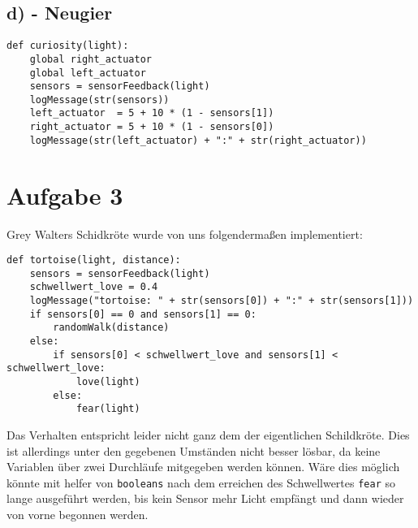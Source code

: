 \documentclass{./Vorlage/mat}
\begin{document}
\subsection*{d) - Neugier}
\begin{lstlisting}
def curiosity(light):
    global right_actuator
    global left_actuator
    sensors = sensorFeedback(light)
    logMessage(str(sensors))
    left_actuator  = 5 + 10 * (1 - sensors[1])
    right_actuator = 5 + 10 * (1 - sensors[0])
    logMessage(str(left_actuator) + ":" + str(right_actuator))
\end{lstlisting}

\section*{Aufgabe 3}

Grey Walters Schidkröte wurde von uns folgendermaßen implementiert:

\begin{lstlisting}
def tortoise(light, distance):
	sensors = sensorFeedback(light)
	schwellwert_love = 0.4
	logMessage("tortoise: " + str(sensors[0]) + ":" + str(sensors[1]))
	if sensors[0] == 0 and sensors[1] == 0:
		randomWalk(distance)
	else:
		if sensors[0] < schwellwert_love and sensors[1] < schwellwert_love:
			love(light)
		else:
			fear(light)
\end{lstlisting}

Das Verhalten entspricht leider nicht ganz dem der eigentlichen Schildkröte. Dies ist allerdings unter den gegebenen Umständen nicht besser lösbar, da keine Variablen über zwei Durchläufe mitgegeben werden können.
Wäre dies möglich könnte mit helfer von \texttt{booleans} nach dem erreichen des Schwellwertes \texttt{fear} so lange ausgeführt werden, bis kein Sensor mehr Licht empfängt und dann wieder von vorne begonnen werden.
\end{document}

